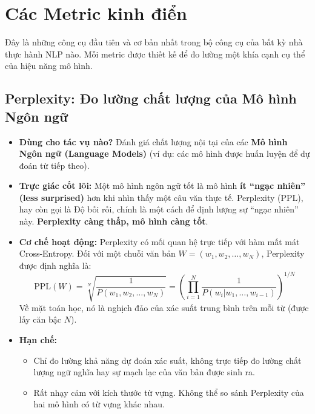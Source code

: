 

\section{Các Metric kinh điển}
\label{sec:classic_metrics}

Đây là những công cụ đầu tiên và cơ bản nhất trong bộ công cụ của bất kỳ nhà thực hành NLP nào. Mỗi metric được thiết kế để đo lường một khía cạnh cụ thể của hiệu năng mô hình.

\subsection{Perplexity: Đo lường chất lượng của Mô hình Ngôn ngữ}
\label{ssec:perplexity}
\begin{itemize}
    \item \textbf{Dùng cho tác vụ nào?} Đánh giá chất lượng nội tại của các \textbf{Mô hình Ngôn ngữ (Language Models)} (ví dụ: các mô hình được huấn luyện để dự đoán từ tiếp theo).
    \item \textbf{Trực giác cốt lõi:} Một mô hình ngôn ngữ tốt là mô hình \textbf{ít “ngạc nhiên” (less surprised)} hơn khi nhìn thấy một câu văn thực tế. Perplexity (PPL), hay còn gọi là Độ bối rối, chính là một cách để định lượng sự “ngạc nhiên” này. \textbf{Perplexity càng thấp, mô hình càng tốt}.
    \item \textbf{Cơ chế hoạt động:} Perplexity có mối quan hệ trực tiếp với hàm mất mát Cross-Entropy. Đối với một chuỗi văn bản $W = (w_1, w_2, \dots, w_N)$, Perplexity được định nghĩa là:
        \begin{equation}
            \text{PPL}(W) = \sqrt[N]{\frac{1}{P(w_1, w_2, \dots, w_N)}} = \left( \prod_{i=1}^{N} \frac{1}{P(w_i|w_1, \dots, w_{i-1})} \right)^{1/N}
            \label{eq:perplexity}
        \end{equation}
        Về mặt toán học, nó là nghịch đảo của xác suất trung bình trên mỗi từ (được lấy căn bậc $N$).
    \item \textbf{Hạn chế:}
        \begin{itemize}
            \item Chỉ đo lường khả năng dự đoán xác suất, không trực tiếp đo lường chất lượng ngữ nghĩa hay sự mạch lạc của văn bản được sinh ra.
            \item Rất nhạy cảm với kích thước từ vựng. Không thể so sánh Perplexity của hai mô hình có từ vựng khác nhau.
        \end{itemize}
\end{itemize}

